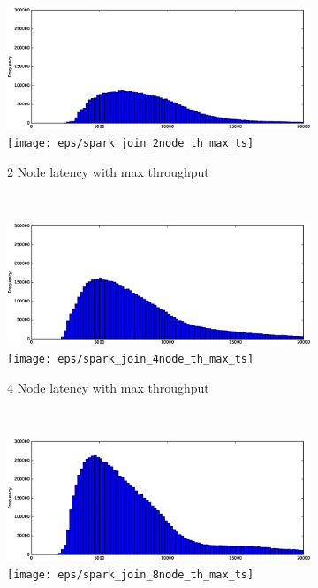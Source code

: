 \begin{figure}
    \centering
    \begin{subfigure}[b]{0.3\textwidth}
        \includegraphics[width=\textwidth]{eps/spark_join_2node_th_max_hist}
         \texttt{[image: eps/spark\_join\_2node\_th\_max\_ts]}

        \caption{2 Node latency with max throughput}
    \end{subfigure}
    ~ 
    \begin{subfigure}[b]{0.3\textwidth}
        \includegraphics[width=\textwidth]{eps/spark_join_4node_th_max_hist}
         \texttt{[image: eps/spark\_join\_4node\_th\_max\_ts]}

        \caption{4 Node latency with max throughput }
    \end{subfigure}
    ~ 
    \begin{subfigure}[b]{0.3\textwidth}
        \includegraphics[width=\textwidth]{eps/spark_join_8node_th_max_hist}
         \texttt{[image: eps/spark\_join\_8node\_th\_max\_ts]}


\end{subfigure}
\end{figure}
